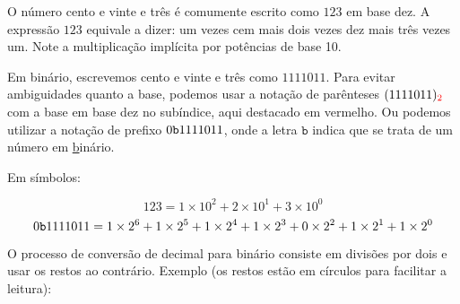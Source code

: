 \documentclass[
	12pt,				%
	openright,			%
	twoside,			%
	a4paper,			%
	english,			%
	french,				%
	brazil,				%
	sumario=tradicional
]{abntex2}
\begin{document}
O número cento e vinte e três é comumente escrito como $123$ em base dez. A expressão $123$ equivale a dizer: um vezes cem mais dois vezes dez mais três vezes um. Note a multiplicação implícita por potências de base 10.

Em binário, escrevemos cento e vinte e três como $1111011$. Para evitar ambiguidades quanto a base, podemos usar a notação de parênteses $(1111011)_{\color{red}2}$ com a base em base dez no subíndice, aqui destacado em vermelho. Ou podemos utilizar a notação de prefixo $0\texttt{b}1111011$, onde a letra $\texttt{b}$ indica que se trata de um número em \underline{b}inário.

Em símbolos:

\[
	123 = 1 \times 10^2 + 2 \times 10^1 + 3 \times 10^0
\]
\[
	0\texttt{b}1111011 = 1 \times 2^6 + 1 \times 2^5 + 1 \times 2^4 + 1 \times 2^3 + 0 \times 2^2 + 1  \times 2^1 + 1  \times 2^0
\]


O processo de conversão de decimal para binário consiste em divisões por dois e usar os restos ao contrário. Exemplo (os restos estão em círculos para facilitar a leitura):

\end{document}

